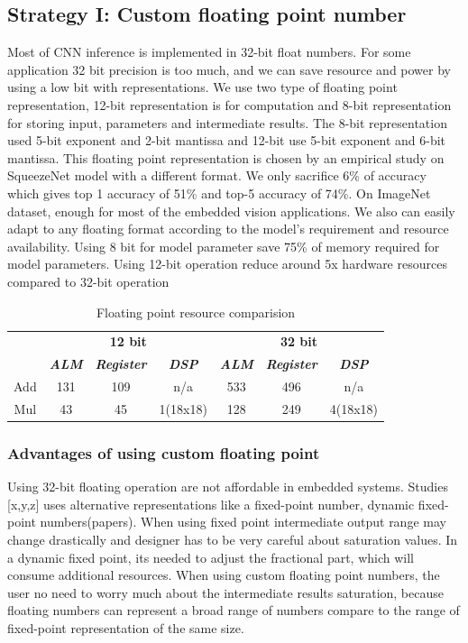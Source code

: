 \documentclass[conference]{IEEEtran}
\begin{document}
\subsection{Strategy I: Custom floating point number
}\label{AA}
Most of CNN inference is implemented in 32-bit float numbers. For some application 32 bit precision is too much, and we can save resource and power by using a low bit with representations. We use two type of floating point representation, 12-bit representation is for computation and 8-bit representation for storing input, parameters and intermediate results. The 8-bit representation used 5-bit exponent and 2-bit mantissa and 12-bit use 5-bit exponent and 6-bit mantissa. This floating point representation is chosen by an empirical study on SqueezeNet model with a different format. We only sacrifice 6\% of accuracy which gives top 1 accuracy of 51\% and top-5 accuracy of 74\%. On ImageNet dataset, enough for most of the embedded vision applications. We also can easily adapt to any floating format according to the model’s requirement and resource availability. Using 8 bit for model parameter save 75\% of memory required for model parameters. Using 12-bit operation reduce around 5x hardware resources compared to 32-bit operation


\begin{table}[htbp]
\caption{Floating point resource comparision}
\begin{center}
\begin{tabular}{|c|c|c|c|c|c|c|}
\hline
				&\multicolumn{3}{|c|}{\textbf{12 bit}} 											&\multicolumn{3}{|c|}{\textbf{32 bit}}\\
				\cline{2-7} 
 				& \textbf{\textit{ALM}} & \textbf{\textit{Register}} & \textbf{\textit{DSP}}	& \textbf{\textit{ALM}}	& \textbf{\textit{Register}} & \textbf{\textit{DSP}}\\
\hline
Add 		& 131 					& 109 							& n/a 					& 533					&496						&n/a  \\
\hline
Mul	& 43 					& 45 							& 1(18x18) 					& 128					&249						&4(18x18)  \\
\hline
\end{tabular}
\label{tab1}
\end{center}
\end{table}
\subsubsection{Advantages of using custom floating point
}
Using 32-bit floating operation are not affordable in embedded systems. Studies [x,y,z] uses alternative representations like a fixed-point number, dynamic fixed-point numbers(papers). When using fixed point intermediate output range may change drastically and designer has to be very careful about saturation values. In a dynamic fixed point, its needed to adjust the fractional part, which will consume additional resources. When using custom floating point numbers, the user no need to worry much about the intermediate results saturation, because floating numbers can represent a broad range of numbers compare to the range of fixed-point representation of the same size. 
\end{document}

